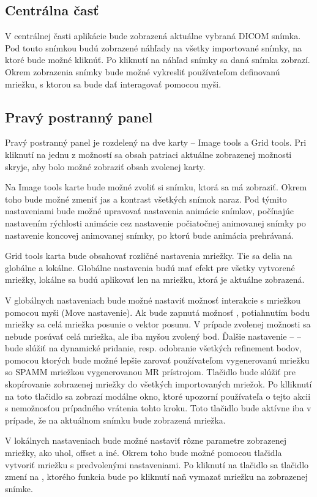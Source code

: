 \subsection {Centrálna časť}
V centrálnej časti aplikácie bude zobrazená aktuálne vybraná DICOM snímka. Pod touto snímkou budú zobrazené náhľady na všetky importované snímky, na ktoré bude možné kliknúť. Po kliknutí na náhľad snímky sa daná snímka zobrazí. Okrem zobrazenia snímky bude možné vykresliť používateľom definovanú mriežku, s ktorou sa bude dať interagovať pomocou myši.

\subsection {Pravý postranný panel}
Pravý postranný panel je rozdelený na dve karty -- Image tools a Grid tools. Pri kliknutí na jednu z možností sa obsah patriaci aktuálne zobrazenej možnosti skryje, aby bolo možné zobraziť obsah zvolenej karty.

Na Image tools karte bude možné zvoliť si snímku, ktorá sa má zobraziť. Okrem toho bude možné zmeniť jas a kontrast všetkých snímok naraz. Pod týmito nastaveniami bude možné upravovať nastavenia animácie snímkov, počínajúc nastavením rýchlosti animácie cez nastavenie počiatočnej animovanej snímky po nastavenie koncovej animovanej snímky, po ktorú bude animácia prehrávaná.

Grid tools karta bude obsahovať rozličné nastavenia mriežky. Tie sa delia na globálne a lokálne. Globálne nastavenia budú mať efekt pre všetky vytvorené mriežky, lokálne sa budú aplikovať len na mriežku, ktorá je aktuálne zobrazená.

V globálnych nastaveniach bude možné nastaviť možnosť interakcie s mriežkou pomocou myši (Move nastavenie). Ak bude zapnutá možnosť , potiahnutím bodu mriežky sa celá mriežka posunie o vektor posunu. V prípade zvolenej možnosti  sa nebude posúvať celá mriežka, ale iba myšou zvolený bod.
Ďalšie nastavenie --  -- bude slúžiť na dynamické pridanie, resp. odobranie všetkých refinement bodov, pomocou ktorých bude možné lepšie zarovať používateľom vygenerovanú mriežku so SPAMM mriežkou vygenerovanou MR prístrojom.
Tlačidlo  bude slúžiť pre skopírovanie zobrazenej mriežky do všetkých importovaných mriežok. Po klliknutí na toto tlačidlo sa zobrazí modálne okno, ktoré upozorní používateľa o tejto akcii s nemožnosťou prípadného vrátenia tohto kroku. Toto tlačidlo bude aktívne iba v prípade, že na aktuálnom snímku bude zobrazená mriežka.

V lokálnych nastaveniach bude možné nastaviť rôzne parametre zobrazenej mriežky, ako uhol, offset a iné. Okrem toho bude možné pomocou tlačidla  vytvoriť mriežku s predvolenými nastaveniami. Po kliknutí na tlačidlo sa tlačidlo zmení na , ktorého funkcia bude po kliknutí naň vymazať mriežku na zobrazenej snímke.